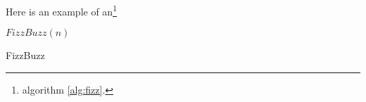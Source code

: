 Here is an example of an\footnote{algorithm \ref{alg:fizz}.}

\begin{algorithm}{$FizzBuzz(n)$}
    \caption{FizzBuzz}
    \label{alg:fizz}
    \begin{algorithmic}[2]
            \ELSE
            \ENDIF
        \ENDFOR
    \end{algorithmic}
\end{algorithm}